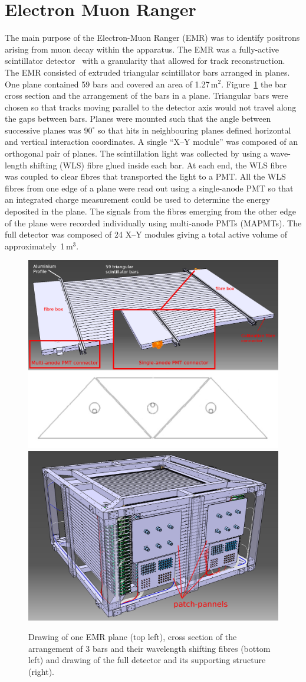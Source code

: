 \graphicspath{{05-EMR/Figures/}}

\section{Electron Muon Ranger}
\label{Sect:EMR}

The main purpose of the Electron-Muon Ranger (EMR) was to identify
positrons arising from muon decay within the apparatus.  
The EMR was a fully-active scintillator
detector~\cite{2016JInst..11T10007} with a granularity that allowed
for track reconstruction.
The EMR consisted of extruded triangular scintillator bars arranged in
planes.
One plane contained 59 bars and covered an area of 1.27\,m$^2$.
Figure~\ref{fig:EMR} the bar cross section and the arrangement of the
bars in a plane.
Triangular bars were chosen so that tracks moving parallel to the
detector axis would not travel along the gaps between bars. 
Planes were mounted such that the angle between successive planes was
$90^{\circ}$ so that hits in neighbouring planes defined horizontal
and vertical interaction coordinates.
A single ``X--Y module'' was composed of an orthogonal pair of
planes.
The scintillation light was collected by using a wave-length shifting
(WLS) fibre glued inside each bar.
At each end, the WLS fibre was coupled to clear fibres that
transported the light to a PMT.
All the WLS fibres from one edge of a plane were read out using a
single-anode PMT so that an integrated charge measurement could be
used to determine the energy deposited in the plane.
The signals from the fibres emerging from the other edge of the plane
were recorded individually using multi-anode PMTs (MAPMTs). 
The full detector was composed of 24 X--Y modules giving a total active 
volume of approximately~1\,m$^3$.
\begin{figure}[htb!]
  \begin{center}
    \includegraphics[width=0.465\columnwidth]{EMR1.png}
    \hfill
    \includegraphics[width=0.515\columnwidth]{EMR2.jpg}
  \end{center}
  \caption{
    Drawing of one EMR plane (top left), cross section of the
    arrangement of 3 bars and their wavelength shifting fibres (bottom
    left) and drawing of the full detector and its supporting
    structure (right).
  }
  \label{fig:EMR}
\end{figure}
